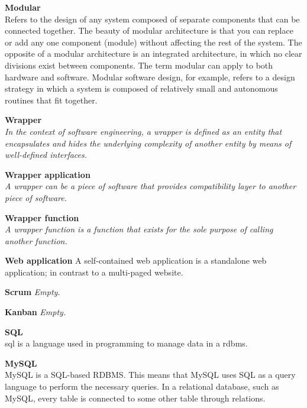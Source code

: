 \textbf{Modular} \\
Refers to the design of any system composed of separate components that can be connected together. The beauty of modular architecture is that you can replace or add any one component (module) without affecting the rest of the system. The opposite of a modular architecture is an integrated architecture, in which no clear divisions exist between components. The term modular can apply to both hardware and software. Modular software design, for example, refers to a design strategy in which a system is composed of relatively small and autonomous routines that fit together. 

\textbf{Wrapper} \\
\textit{In the context of software engineering, a wrapper is defined as an entity that encapsulates and hides the underlying complexity of another entity by means of well-defined interfaces.}


\textbf{Wrapper application} \\
\textit{A wrapper can be a piece of software that provides compatibility layer to another piece of software.}

\textbf{Wrapper function} \\
\textit{A wrapper function is a function that exists for the sole purpose of calling another function.}


\textbf{Web application}
A self-contained web application is a standalone web application; in contrast to a multi-paged website.

\textbf{Scrum}
\textit{Empty.}

\textbf{Kanban}
\textit{Empty.}

\textbf{SQL } \\
\acrfull{sql} is a language used in programming to manage data in a \acrfull{rdbms}.

\textbf{MySQL } \\
MySQL is a SQL-based RDBMS. This means that MySQL uses SQL as a query language to perform the necessary queries. In a relational database, such as MySQL, every table is connected to some other table through relations. 


